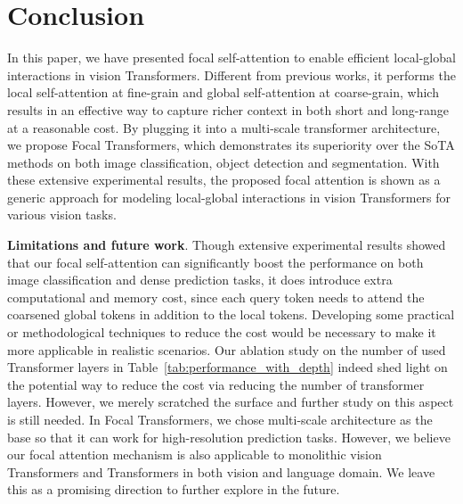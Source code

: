 \documentclass{article}
\begin{document}
 \section{Conclusion}
In this paper, we have presented focal self-attention to enable efficient local-global interactions in vision Transformers. Different from previous works, it performs the local self-attention at fine-grain and global self-attention at coarse-grain, which results in an effective way to capture richer context in both short and long-range at a reasonable cost. By plugging it into a multi-scale transformer architecture, we propose Focal Transformers, which demonstrates its superiority over the SoTA methods on both image classification, object detection and segmentation. With these extensive experimental results, the proposed focal attention is shown as a generic approach for modeling local-global interactions in vision Transformers for various vision tasks.

\textbf{Limitations and future work}. Though extensive experimental results showed that our focal self-attention can significantly boost the performance on both image classification and dense prediction tasks, it does introduce extra computational and memory cost, since each query token needs to attend the coarsened global tokens in addition to the local tokens. Developing some practical or methodological techniques to reduce the cost would be necessary to make it more applicable in realistic scenarios. Our ablation study on the number of used Transformer layers in Table~\ref{tab:performance_with_depth} indeed shed light on the potential way to reduce the cost via reducing the number of transformer layers. However, we merely scratched the surface and further study on this aspect is still needed. In Focal Transformers, we chose multi-scale architecture as the base so that it can work for high-resolution prediction tasks. However, we believe our focal attention mechanism is also applicable to monolithic vision Transformers and Transformers in both vision and language domain. We leave this as a promising direction to further explore in the future. {\small


}















\newpage
\appendix
\end{document}
